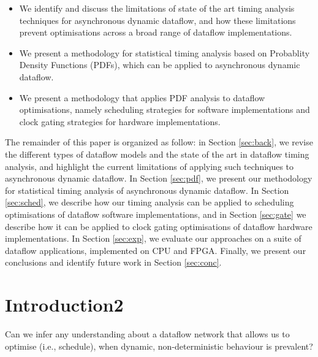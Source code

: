 \begin{itemize}
\item We identify and discuss the limitations of state of the art timing analysis techniques for asynchronous dynamic dataflow, and how these limitations prevent optimisations across a broad range of dataflow implementations.
\item We present a methodology for statistical timing analysis based on Probablity Density Functions (PDFs), which can be applied to asynchronous dynamic dataflow.
\item We present a methodology that applies PDF analysis to dataflow optimisations, namely scheduling strategies for software implementations and clock gating strategies for hardware implementations.
\end{itemize}

\par The remainder of this paper is organized as follow: in Section \ref{sec:back}, we revise the different types of dataflow models and the state of the art in dataflow timing analysis, and highlight the current limitations of applying such techniques to asynchronous dynamic dataflow. In Section \ref{sec:pdf}, we present our methodology for statistical timing analysis of asynchronous dynamic dataflow. In Section \ref{sec:sched}, we describe how our timing analysis can be applied to scheduling optimisations of dataflow software implementations, and in Section \ref{sec:gate} we describe how it can be applied to clock gating optimisations of dataflow hardware implementations. In Section \ref{sec:exp}, we evaluate our approaches on a suite of dataflow applications, implemented on CPU and FPGA. Finally, we present our conclusions and identify future work in Section \ref{sec:conc}. 


\section{Introduction2}

Can we infer any understanding about a dataflow network that allows us to optimise (i.e., schedule), when dynamic, non-deterministic behaviour is prevalent?
